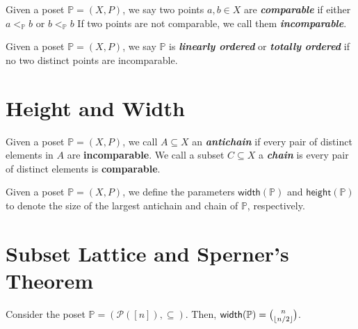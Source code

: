 \begin{definition}[Comparability]
    Given a poset $\mathbb{P} = (X,P)$, we say two points $a,b \in X$ are \textit{\textbf{comparable}} if either $a <_{\mathbb{P}} b$ or $b <_{\mathbb{P}} b$ If two points are not comparable, we call them \textit{\textbf{incomparable}}.
\end{definition}

\begin{definition}
    Given a poset $\mathbb{P} = (X,P)$, we say $\mathbb{P}$ is \textit{\textbf{linearly ordered}} or \textit{\textbf{totally ordered}} if no two distinct points are incomparable.
\end{definition}

\section{Height and Width}

\begin{definition}
    Given a poset $\mathbb{P} = (X,P)$, we call $A \subseteq X$ an \textit{\textbf{antichain}} if every pair of distinct elements in $A$ are \textbf{incomparable}. We call a subset $C \subseteq X$ a \textit{\textbf{chain}} is every pair of distinct elements is \textbf{comparable}.
\end{definition}

\begin{definition}
    Given a poset $\mathbb{P} = (X,P)$, we define the parameters $\mathsf{width}(\mathbb{P})$ and $\mathsf{height}(\mathbb{P})$ to denote the size of the largest antichain and chain of $\mathbb{P}$, respectively.
\end{definition}

\section{Subset Lattice and Sperner's Theorem}

\begin{theorem}
    Consider the poset $\mathbb{P} = (\mathcal{P}([n]), \subseteq)$. Then, $\mathsf{width}(\mathbb{P}) = \binom{n}{\lfloor n/2\rfloor}$.
\end{theorem}

